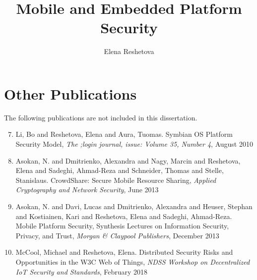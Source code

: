 \documentclass[dissertation,math,vertlayout]{aaltoseries}
\author{Elena Reshetova}
\title{Mobile and Embedded Platform Security}
\begin{document}
\draftabstract{\lipsum[1-3]}




\clearpage
\tableofcontents


\listofpublications

\chapter*{Other Publications}%
%
The following publications are not included in this dissertation.
\begin{enumerate}%
		\setcounter{enumi}{6}
		\renewcommand{\labelenumi}{\bfseries\Roman{enumi}}%
		  \item Li, Bo and Reshetova, Elena and Aura, Tuomas. Symbian OS Platform Security Model, \textit{The ;login journal, issue: 
Volume 35, Number 4}, August 2010
			\item Asokan, N. and Dmitrienko, Alexandra and Nagy, Marcin and Reshetova, Elena and Sadeghi, Ahmad-Reza and Schneider, Thomas and Stelle, Stanislaus. CrowdShare: Secure Mobile Resource Sharing, \textit{Applied Cryptography and Network Security}, June 2013
			\item Asokan, N. and Davi, Lucas and Dmitrienko, Alexandra and Heuser, Stephan and Kostiainen, Kari and Reshetova, Elena and Sadeghi, Ahmad-Reza. Mobile Platform Security, Synthesis Lectures on Information Security, Privacy, and Trust, \textit{Morgan \& Claypool Publishers}, December 2013
			\item McCool, Michael and Reshetova, Elena. Distributed Security Risks and Opportunities in the W3C Web of Things, \textit{NDSS Workshop on Decentralized IoT Security and Standards}, February 2018
\end{enumerate}%
		
\clearpage
\end{document}
